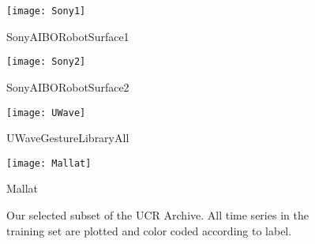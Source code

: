 \documentclass[../../thesis.tex]{subfiles}
\begin{document}
\begin{figure}[h]
    \vspace{0.4cm}
    
    \begin{minipage}[b]{0.32\textwidth}
        \centering
        \texttt{[image: Sony1]}
        \caption*{SonyAIBORobotSurface1}
    \end{minipage}
    \hfill
    \begin{minipage}[b]{0.32\textwidth}
        \centering
        \texttt{[image: Sony2]}
        \caption*{SonyAIBORobotSurface2}
    \end{minipage}
    \hfill
    \begin{minipage}[b]{0.32\textwidth}
        \centering
        \texttt{[image: UWave]}
        \caption*{UWaveGestureLibraryAll}
    \end{minipage}
    
    \vspace{0.4cm}
    
    \begin{minipage}[b]{0.32\textwidth}
        \centering
        \texttt{[image: Mallat]}
        \caption*{Mallat}
    \end{minipage}
    \caption{Our selected subset of the UCR Archive. All time series in the training set are plotted and color coded according to label.}
    \label{fig:datasets}
\end{figure}
\end{document}
